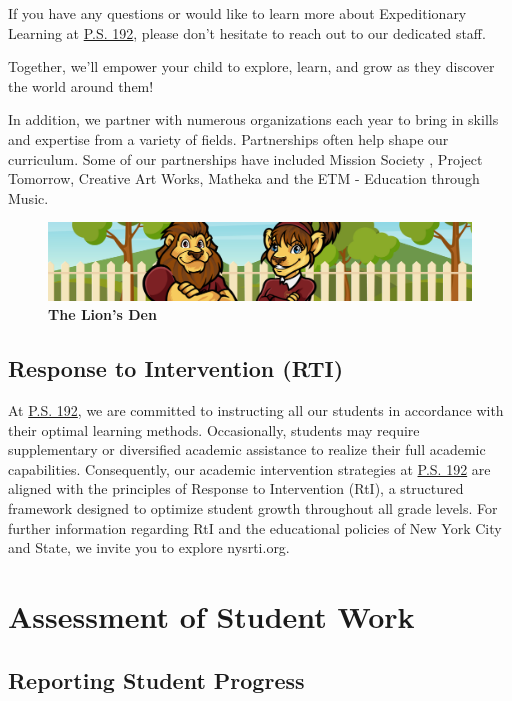 \documentclass[11pt, letterpaper]{article}
\begin{document}
If you have any questions or would like to learn more about Expeditionary Learning at \href{https://www.ps192.org}{P.S. 192}, please don't hesitate to reach out to our dedicated staff.

Together, we'll empower your child to explore, learn, and grow as they discover the world around them!

In addition, we partner with numerous organizations each year to bring in skills and expertise from a variety of fields. Partnerships often help shape our curriculum. Some of our partnerships have included Mission Society	, Project Tomorrow, Creative Art Works, Matheka and the ETM - Education through Music. 

\begin{figure}[H]
  \centering
\includegraphics[width=1\linewidth]{2.png}
\caption{\textbf{The Lion's Den}}
  \label{fig:school mascots}
\end{figure}

\subsection{Response to Intervention (RTI)}
At \href{https://www.ps192.org}{P.S. 192}, we are committed to instructing all our students in accordance with their optimal learning methods. Occasionally, students may require supplementary or diversified academic assistance to realize their full academic capabilities. Consequently, our academic intervention strategies at \href{https://www.ps192.org}{P.S. 192} are aligned with the principles of Response to Intervention (RtI), a structured framework designed to optimize student growth throughout all grade levels. For further information regarding RtI and the educational policies of New York City and State, we invite you to explore nysrti.org.

\section{Assessment of Student Work}

\subsection{Reporting Student Progress}
\end{document}
